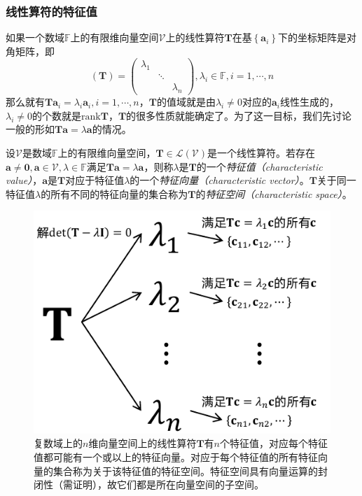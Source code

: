 \documentclass[main.tex]{subfiles}
\begin{document}
\subsubsection{线性算符的特征值}
如果一个数域$\mathbb{F}$上的有限维向量空间$\mathcal{V}$上的线性算符$\mathbf{T}$在基$\left\{\mathbf{a}_i\right\}$下的坐标矩阵是对角矩阵，即
\[\left(\mathbf{T}\right)=\left(\begin{array}{ccc}\lambda_1&&\\&\ddots&\\&&\lambda_n\end{array}\right),\lambda_i\in\mathbb{F},i=1,\cdots,n\]
那么就有$\mathbf{Ta}_i=\lambda_i \mathbf{a}_i,i=1,\cdots,n$，$\mathbf{T}$的值域就是由$\lambda_i\neq 0$对应的$\mathbf{a}_i$线性生成的，$\lambda_i\neq 0$的个数就是$\mathrm{rank}\mathbf{T}$，$\mathbf{T}$的很多性质就能确定了。为了这一目标，我们先讨论一般的形如$\mathbf{Ta}=\lambda\mathbf{a}$的情况。

\begin{definition}\label{def:II.2.21}
    设$\mathcal{V}$是数域$\mathbb{F}$上的有限维向量空间，$\mathbf{T}\in\mathcal{L}\left(\mathcal{V}\right)$是一个线性算符。若存在$\mathbf{a}\neq\mathbf{0},\mathbf{a}\in\mathcal{V},\lambda\in\mathbb{F}$满足$\mathbf{Ta}=\lambda\mathbf{a}$，则称$\lambda$是$\mathbf{T}$的一个\emph{特征值（characteristic value）}，$\mathbf{a}$是$\mathbf{T}$对应于特征值$\lambda$的一个\emph{特征向量（characteristic vector）}。$\mathbf{T}$关于同一特征值$\lambda$的所有不同的特征向量的集合称为$\mathbf{T}$的\emph{特征空间（characteristic space）}。
\end{definition}

\begin{figure}[htbp]
    \centering
    \includegraphics{images/characteristic_values.pdf}
    \caption{复数域上的$n$维向量空间上的线性算符$\mathbf{T}$有$n$个特征值，对应每个特征值都可能有一个或以上的特征向量。对应于每个特征值的所有特征向量的集合称为关于该特征值的特征空间。特征空间具有向量运算的封闭性（需证明），故它们都是所在向量空间的子空间。}
    \label{fig:II.2.3}
\end{figure}
\end{document}
